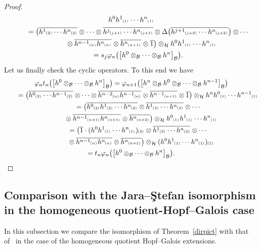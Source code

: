 \documentclass[pdftex]{sigma}
\numberwithin{equation}{section}
\newcommand{\ps}[1]{~\hspace{-4pt}_{^{(#1)}}}
\newcommand{\wbar}[1]{\overline{#1}}
\begin{document}
\begin{proof}
\begin{gather*}
h^0h^1\ps{1}\cdots h^n\ps{1}
\\
\qquad
=\big(\wbar{h^1\ps{2}\cdots h^n\ps{2}} \otimes\cdots\otimes \wbar{h^j\ps{j+1}\cdots h^n\ps{j+1}} \otimes
\Delta\big(\wbar{h^{j+1}\ps{j+2}\cdots h^n\ps{j+2}}\big)\otimes \cdots
\\
\qquad
\phantom{=}{}
\otimes \wbar{h^{n-1}\ps{n}h^n\ps{n}} \otimes \wbar{h^n\ps{n+1}} \otimes \wbar{1}\big) \otimes_{\cal H}
h^0h^1\ps{1}\cdots h^n\ps{1}
\\
\qquad
=s_j\varphi_{n}\big(\big[h^0\otimes_{\cal B}\cdots\otimes_{\cal B} h^n\big]_{\cal B}\big).
\end{gather*}
Let us f\/inally check the cyclic operators.
To this end we have
\begin{gather*}
\varphi_{n}t_n\big(\big[h^0\otimes_{\cal B}\cdots\otimes_{\cal B} h^n\big]_{\cal B}\big) =\varphi_{n+1}\big(\big[h^n\otimes_{\cal B}
h^0\otimes_{\cal B}\cdots\otimes_{\cal B} h^{n-1}\big]_{\cal B}\big)
\\
\qquad
=\big(\wbar{h^0\ps{2}\cdots h^{n-1}\ps{2}} \otimes\cdots\otimes \wbar{h^{n-2}\ps{n}h^{n-1}\ps{n}} \otimes
\wbar{h^{n-1}\ps{n+1}} \otimes \wbar{1}\big) \otimes_{\cal H} h^nh^0\ps{1}\cdots h^{n-1}\ps{1}
\\
\qquad
=\big(\wbar{h^0\ps{2}h^1\ps{2}\cdots h^n\ps{2}}\otimes \wbar{h^1\ps{3}\cdots h^n\ps{3}} \otimes\cdots
\\
\qquad
\phantom{=}{}
\otimes \wbar{h^{n-1}\ps{n+1}h^n\ps{n+1}} \otimes \wbar{h^n\ps{n+2}} \big) \otimes_{\cal H}
h^0\ps{1}h^1\ps{1}\cdots h^n\ps{1}
\\
\qquad
=\big(\wbar{1}\cdot (h^0h^1\ps{1}\cdots h^n\ps{1})\ps{2}\otimes \wbar{h^1\ps{2}\cdots h^n\ps{2}} \otimes\cdots
\\
\qquad
\phantom{=}{}
\otimes \wbar{h^{n-1}\ps{n}h^n\ps{n}} \otimes \wbar{h^n\ps{n+1}} \big) \otimes_{\cal H}
(h^0h^1\ps{1}\cdots h^n\ps{1})\ps{1}
\\
\qquad
=t_n\varphi_{n}\big(\big[h^0\otimes_{\cal B}\cdots\otimes_{\cal B} h^n\big]_{\cal B}\big). \tag*{\qed}
\end{gather*}
\renewcommand{\qed}{}
\end{proof}


\subsection{Comparison with the Jara--\c{S}tefan isomorphism\\ in the homogeneous quotient-Hopf--Galois case}

In this subsection we compare the isomorphism of Theorem~\ref{dirpict} with that of~\cite[Theorem~3.7]{JaraStef06} in
the case of the homogeneous quotient Hopf--Galois extensions.
\end{document}
